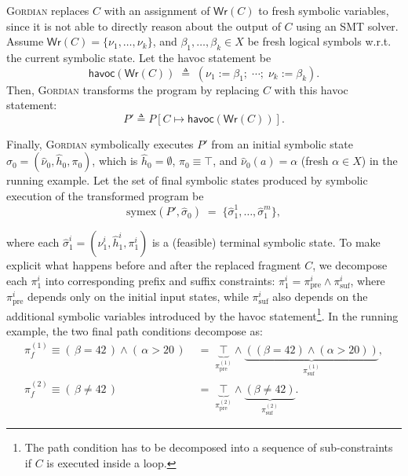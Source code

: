 \documentclass[acmsmall,screen,nonacm]{acmart}
\newcommand{\projName}{\textsc{Gordian}\xspace}
\theoremstyle{definition}
\begin{document}
\projName replaces $C$ with an assignment of $\mathsf{Wr}(C)$ to fresh symbolic variables, since it is not able to directly reason about the output of $C$ using an SMT solver. Assume \(\mathsf{Wr}(C)=\{\nu_1,\dots,\nu_k\}\), and \(\beta_1,\dots,\beta_k\in X\) be fresh logical symbols w.r.t. the current symbolic state. Let the havoc statement be
\[
\mathsf{havoc}(\mathsf{Wr}(C)) \;\triangleq\; (\nu_1 := \beta_1;\;\cdots;\; \nu_k := \beta_k).
\]
Then, \projName transforms the program by replacing $C$ with this havoc statement:
\[
P' \triangleq P[C \mapsto \mathsf{havoc}(\mathsf{Wr}(C))].
\]

Finally, \projName symbolically executes $P'$ from an initial symbolic state
$\hat\sigma_0=(\hat\nu_0,\hat h_0,\pi_0)$, which is $\hat h_0=\emptyset$, $\pi_0\equiv \top$, and $\hat\nu_0(a)=\alpha$ (fresh $\alpha\in X$) in the running example. Let the set of final symbolic states produced by symbolic execution of the transformed program be
\[
\mathrm{symex}(P',\hat\sigma_0)
\;=\;
\{\hat\sigma_1^1,\ldots,\hat\sigma_1^m\},
\]

\noindent where each \(\hat\sigma_1^i=(\hat\nu_1^i,\hat h_1^i,\pi_1^i)\) is a (feasible) terminal symbolic state. To make explicit what happens before and after the replaced fragment \(C\), we decompose each $\pi_1^i$ into corresponding prefix and suffix constraints: $\pi_1^i = \pi_\mathrm{pre}^i \wedge \pi_\mathrm{suf}^i$, where $\pi_\mathrm{pre}^i$ depends only on the initial input states, while $\pi_\mathrm{suf}^i$ also depends on the additional symbolic variables introduced by the havoc statement\footnote{The path condition has to be decomposed into a sequence of sub-constraints if $C$ is executed inside a loop.}. In the running example, the two final path conditions decompose as:
\begin{align*}
\pi_f^{(1)} \equiv (\,\beta = 42\,)\wedge(\,\alpha>20\,)
\;&=\;
\underbrace{\top}_{\pi_{\mathrm{pre}}^{(1)}}\wedge
\underbrace{((\beta=42)\wedge(\alpha>20))}_{\pi_{\mathrm{suf}}^{(1)}},\\
\pi_f^{(2)} \equiv (\,\beta \neq 42\,)
\;&=\;
\underbrace{\top}_{\pi_{\mathrm{pre}}^{(2)}}\wedge
\underbrace{(\beta\neq 42)}_{\pi_{\mathrm{suf}}^{(2)}}.
\end{align*}
\end{document}
